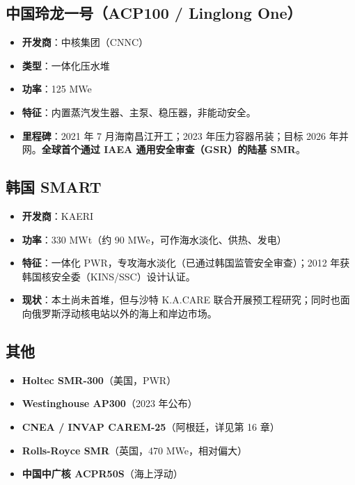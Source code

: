 \documentclass[
  UTF8,
  scheme=plain,
  fontsize=10pt,
  openany
]{ctexbook}
\begin{document}
\subsection{中国玲龙一号（ACP100 / Linglong
One）}\label{ux4e2dux56fdux73b2ux9f99ux4e00ux53f7acp100-linglong-one}

\begin{itemize}
\tightlist
\item
  \textbf{开发商}：中核集团（CNNC）
\item
  \textbf{类型}：一体化压水堆
\item
  \textbf{功率}：125 MWe
\item
  \textbf{特征}：内置蒸汽发生器、主泵、稳压器，非能动安全。
\item
  \textbf{里程碑}：2021 年 7 月海南昌江开工；2023 年压力容器吊装；目标
  2026 年并网。\textbf{全球首个通过 IAEA 通用安全审查（GSR）的陆基
  SMR}。
\end{itemize}

\subsection{韩国 SMART}\label{ux97e9ux56fd-smart}

\begin{itemize}
\tightlist
\item
  \textbf{开发商}：KAERI
\item
  \textbf{功率}：330 MWt（约 90 MWe，可作海水淡化、供热、发电）
\item
  \textbf{特征}：一体化
  PWR，专攻海水淡化（已通过韩国监管安全审查）；2012
  年获韩国核安全委（KINS/SSC）设计认证。
\item
  \textbf{现状}：本土尚未首堆，但与沙特 K.A.CARE
  联合开展预工程研究；同时也面向俄罗斯浮动核电站以外的海上和岸边市场。
\end{itemize}

\subsection{其他}\label{ux5176ux4ed6}

\begin{itemize}
\tightlist
\item
  \textbf{Holtec SMR-300}（美国，PWR）
\item
  \textbf{Westinghouse AP300}（2023 年公布）
\item
  \textbf{CNEA / INVAP CAREM-25}（阿根廷，详见第 16 章）
\item
  \textbf{Rolls-Royce SMR}（英国，470 MWe，相对偏大）
\item
  \textbf{中国中广核 ACPR50S}（海上浮动）
\end{itemize}
\end{document}
